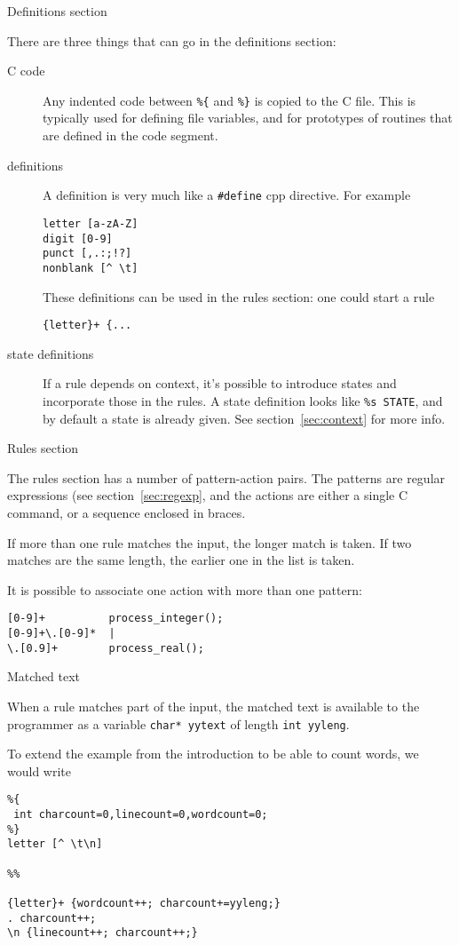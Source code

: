  {Definitions section}
\label{lex:def}

There are three things that can go in the definitions section:
\begin{description}
\item[C code] Any indented code between \verb+%{+ and \verb+%}+
  is copied to the C file. This is typically used for defining file
  variables, and for prototypes of routines that are defined in the
  code segment.
\item[definitions] A definition is very much like a
  \verb+#define+ cpp directive. For example
\begin{verbatim}
letter [a-zA-Z]
digit [0-9]
punct [,.:;!?]
nonblank [^ \t]
\end{verbatim}
  These definitions can be used in the rules section: one could start
  a rule
\begin{verbatim}
{letter}+ {...
\end{verbatim}
\item[state definitions] If a rule depends on context, it's possible
  to introduce states and incorporate those in the rules. A state
  definition looks like \verb+%s STATE+, and by default a state
   is already given. See section~\ref{sec:context} for more info.
\end{description}

 {Rules section}

The rules section has a number of pattern-action pairs. The patterns
are regular expressions (see section~\ref{sec:regexp}, and the actions
are either a single C command, or a sequence enclosed in braces.

If more than one rule matches the input, the longer match is taken. If
two matches are the same length, the earlier one in the list is taken.

It is possible to associate one action with more than one pattern:
\begin{verbatim}
[0-9]+          process_integer();
[0-9]+\.[0-9]*  |
\.[0.9]+        process_real();
\end{verbatim}

 {Matched text}

When a rule matches part of the input, the matched text is available
to the programmer as a variable \verb+char* yytext+ of length
\verb+int yyleng+.

To extend the example from the introduction to be able to count words,
we would write
\begin{verbatim}
%{
 int charcount=0,linecount=0,wordcount=0;
%}
letter [^ \t\n]

%%

{letter}+ {wordcount++; charcount+=yyleng;}
. charcount++;
\n {linecount++; charcount++;}
\end{verbatim}

